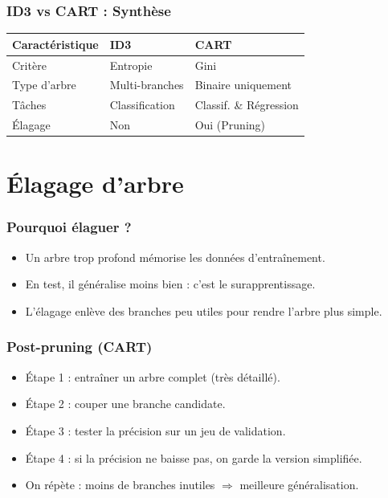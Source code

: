 \documentclass{beamer}
\begin{document}
\begin{frame}
    \frametitle{ID3 vs CART : Synthèse}
    \begin{table}
        \renewcommand{\arraystretch}{1.2}
        \begin{tabular}{@{} lll @{}}
            \toprule
            \textbf{Caractéristique} & \textbf{ID3} & \textbf{CART} \\
            \midrule
            Critère & Entropie & Gini \\
            Type d'arbre & Multi-branches & Binaire uniquement \\
            Tâches & Classification & Classif. \& Régression \\
            Élagage & Non & Oui (Pruning) \\
            \bottomrule
        \end{tabular}
    \end{table}
\end{frame}

\section{Élagage d'arbre}

\begin{frame}
	\frametitle{Pourquoi élaguer ?}
	\begin{itemize}
		\item Un arbre trop profond mémorise les données d'entraînement.
		\item En test, il généralise moins bien : c'est le surapprentissage.
		\item L'élagage enlève des branches peu utiles pour rendre l'arbre plus simple.
	\end{itemize}
\end{frame}

\begin{frame}
	\frametitle{Post-pruning (CART)}
	\begin{itemize}
		\item Étape 1 : entraîner un arbre complet (très détaillé).
		\item Étape 2 : couper une branche candidate.
		\item Étape 3 : tester la précision sur un jeu de validation.
		\item Étape 4 : si la précision ne baisse pas, on garde la version simplifiée.
		\item On répète : moins de branches inutiles $\Rightarrow$ meilleure généralisation.
	\end{itemize}
	\vspace{0.4em}
	\footnotesize
\end{frame}
\end{document}
